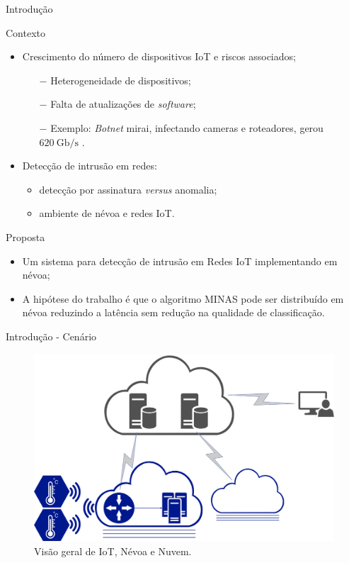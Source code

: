 \documentclass[aspectratio=1610,10pt]{beamer}
\newcommand{\fonte}[1]{\vspace{-1em}{\footnotesize\textbf{Fonte:} #1}}
\begin{document}
\begin{frame}{Introdução}
  \begin{block}{Contexto}
  \begin{itemize}%
  \item Crescimento do número de dispositivos IoT e riscos associados;
  \begin{itemize}
    \item[$-$] Heterogeneidade de dispositivos;
    \item[$-$] Falta de atualizações de \emph{software};
    \item[$-$] Exemplo: \emph{Botnet} mirai, infectando cameras e roteadores, gerou
    $620 \ \mathrm{Gb/s}$ \cite{Kambourakis2017}.
  \end{itemize}
  \item Detecção de intrusão em redes:
  \begin{itemize}
    \item detecção por assinatura \emph{versus} anomalia;
    \item ambiente de névoa e redes IoT.
  \end{itemize}
  \end{itemize}
  \end{block}

  \begin{block}{Proposta}
  \begin{itemize}
  \item Um sistema para detecção de intrusão em Redes IoT implementando em névoa;
  \item A hipótese do trabalho é que o algoritmo MINAS pode ser distribuído em
  névoa reduzindo a latência sem redução na qualidade de classificação.
  \end{itemize}
  \end{block}
\end{frame}


\begin{frame}{Introdução - Cenário}
  \begin{figure}\centering
    \includegraphics[width=0.75\linewidth]{figures/mfog-arch-fisica.png}
    \caption{Visão geral de IoT, Névoa e Nuvem.}
    \fonte{O autor.}
  \end{figure}
\end{frame}
\end{document}
